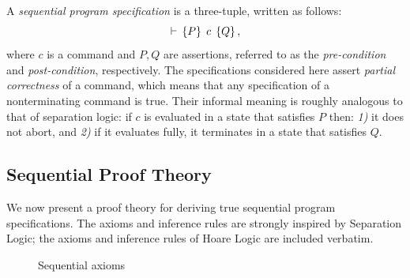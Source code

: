 \documentclass[11pt]{report}         %
\begin{document}
A \emph{sequential program specification} is a three-tuple, written as follows: \[ \vdash\,\left\lbrace P \right\rbrace\;c\;\left\lbrace Q \right\rbrace, \] where $c$ is a command and $P,Q$ are assertions, referred to as the \emph{pre-condition} and \emph{post-condition}, respectively. The specifications considered here assert \emph{partial correctness} of a command, which means that any specification of a nonterminating command is true. Their informal meaning is roughly analogous to that of separation logic: if $c$ is evaluated in a state that satisfies $P$ then: \emph{1)} it does not abort, and \emph{2)} if it evaluates fully, it terminates in a state that satisfies $Q$. 

\subsection{Sequential Proof Theory}
\label{sec:sequential-proof-theory}

We now present a proof theory for deriving true sequential program specifications. The axioms and inference rules are strongly inspired by Separation Logic; the axioms and inference rules of Hoare Logic are included verbatim. 

\begin{figure}[ht]
    \centering
    \caption{\label{fig:sequential-axioms}Sequential axioms}
\end{figure}
\end{document}
